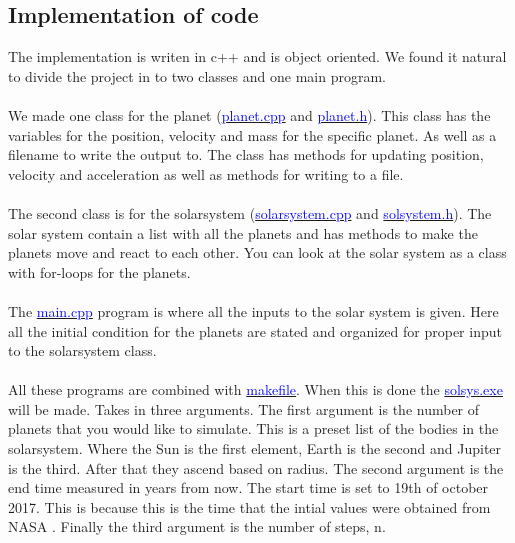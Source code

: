 \subsection{Implementation of code}

The implementation is writen in c++ and is object oriented. We found it natural to divide the project in to two classes and one main program. 
\\
\\
We made one class for the planet (\href{https://github.com/erikfsk/Project-3/blob/master/Project3/planet.cpp}{\textcolor{blue}{planet.cpp}} and \href{https://github.com/erikfsk/Project-3/blob/master/Project3/planet.h}{\textcolor{blue}{planet.h}}). This class has the variables for the position, velocity and mass for the specific planet. As well as a filename to write the output to. The class has methods for updating position, velocity and acceleration as well as methods for writing to a file. 
\\
\\
The second class is for the solarsystem (\href{https://github.com/erikfsk/Project-3/blob/master/Project3/solarsystem.cpp}{\textcolor{blue}{solarsystem.cpp}} and \href{https://github.com/erikfsk/Project-3/blob/master/Project3/solarsystem.h}{\textcolor{blue}{solsystem.h}}). The solar system contain a list with all the planets and has methods to make the planets move and react to each other. You can look at the solar system as a class with for-loops for the planets. 
\\
\\
The \href{https://github.com/erikfsk/Project-3/blob/master/Project3/main.cpp}{\textcolor{blue}{main.cpp}} program is where all the inputs to the solar system is given. Here all the initial condition for the planets are stated and organized for proper input to the solarsystem class. 
\\
\\
All these programs are combined with \href{https://github.com/erikfsk/Project-3/blob/master/Project3/makefile}{\textcolor{blue}{makefile}}. When this is done the \href{https://github.com/erikfsk/Project-3/blob/master/Project3/solsys.exe}{\textcolor{blue}{solsys.exe}} will be made. Takes in three arguments. The first argument is the number of planets that you would like to simulate. This is a preset list of the bodies in the solarsystem. Where the Sun is the first element, Earth is the second and Jupiter is the third. After that they ascend based on radius. The second argument is the end time measured in years from now. The start time is set to 19th of october 2017. This is because this is the time that the intial values were obtained from NASA . Finally the third argument is the number of steps, n. 

